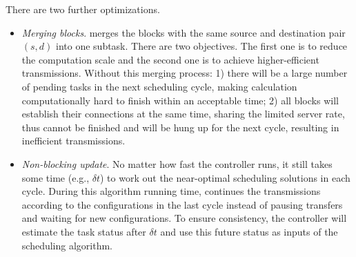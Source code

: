 There are two further optimizations.
\begin{itemize}
\item \emph{Merging blocks}. \name merges the blocks with the same source and destination pair $(s,d)$ into one subtask. There are two objectives. The first one is to reduce the computation scale and the second one is to achieve higher-efficient transmissions. Without this merging process: 1) there will be a large number of pending tasks in the next scheduling cycle, making calculation computationally hard to finish within an acceptable time; 2) all blocks will establish their connections at the same time, sharing the limited server rate, thus cannot be finished and will be hung up for the next cycle, resulting in inefficient transmissions.%
\item \emph{Non-blocking update}. No matter how fast the controller runs, it still takes some time (e.g., $\delta t$) to work out the near-optimal scheduling solutions in each cycle. During this algorithm running time, \name continues the transmissions according to the configurations in the last cycle instead of pausing transfers and waiting for new configurations. To ensure consistency, the controller will estimate the task status after $\delta t$ and use this future status as inputs of the scheduling algorithm.
\end{itemize}

%
%
%
%

